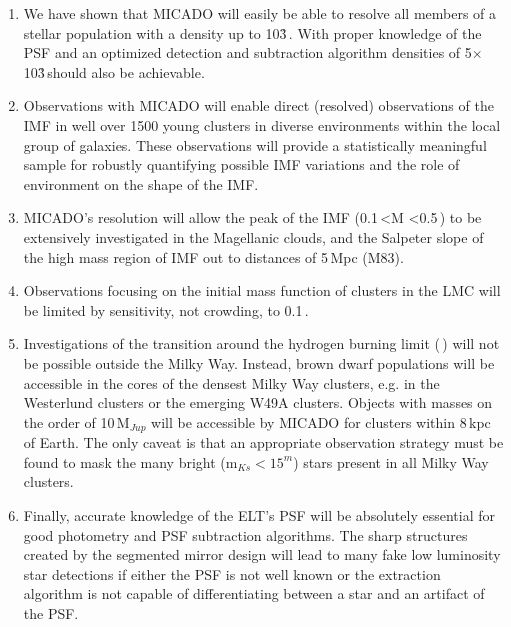 \begin{enumerate}
    \item We have shown that MICADO will easily be able to resolve all members of a stellar population with a density up to 10\h3\,\spae. With proper knowledge of the PSF and an optimized detection and subtraction algorithm densities of 5$\times$10\h3\,\spa should also be achievable.
    
    \item Observations with MICADO will enable direct (resolved) observations of the IMF in well over 1500 young clusters in diverse environments within the local group of galaxies. These observations will provide a statistically meaningful sample for robustly quantifying possible IMF variations and the role of environment on the shape of the IMF.

    
    \item MICADO's resolution will allow the peak of the IMF (0.1\,\msun\textless M \textless0.5\,\msune) to be extensively investigated in the Magellanic clouds, and the Salpeter slope of the high mass region of IMF out to distances of 5\,Mpc (M83).
    
    \item Observations focusing on the initial mass function of clusters in the LMC will be limited by sensitivity, not crowding, to 0.1\,\msun. 
    
    \item Investigations of the transition around the hydrogen burning limit (\,\msun) will not be possible outside the Milky Way. Instead, brown dwarf populations will be accessible in the cores of the densest Milky Way clusters, e.g. in the Westerlund clusters or the emerging W49A clusters. Objects with masses on the order of 10\,M$_{Jup}$ will be accessible by MICADO for clusters within 8\,kpc of Earth. The only caveat is that an appropriate observation strategy must be found to mask the many bright (m$_{Ks}<15^m$) stars present in all Milky Way clusters.    
    
    \item Finally, accurate knowledge of the ELT's PSF will be absolutely essential for good photometry and PSF subtraction algorithms. The sharp structures created by the segmented mirror design will lead to many fake low luminosity star detections if either the PSF is not well known or the extraction algorithm is not capable of differentiating between a star and an artifact of the PSF.
    
\end{enumerate}


